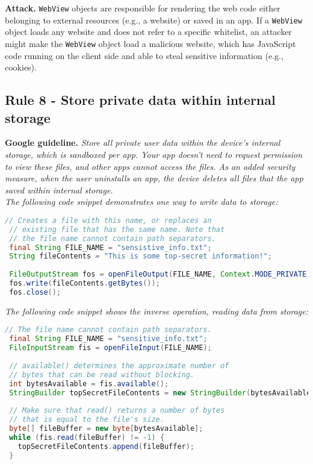 \textbf{Attack.} \texttt{WebView} objects are responsible for rendering the web code either belonging to external resources (e.g., a website) or saved in an app. If a \texttt{WebView} object loads any website and does not refer to a specific whitelist, an attacker might make the \texttt{WebView} object load a malicious website, which has JavaScript code running on the client side and able to steal sensitive information (e.g., cookies). 

\subsection{Rule 8 - Store private data within internal storage} 
\textbf{Google guideline.} \emph{ Store all private user data within the device's internal storage, which is sandboxed per app. Your app doesn't need to request permission to view these files, and other apps cannot access the files. As an added security measure, when the user uninstalls an app, the device deletes all files that the app saved within internal storage.
\\
The following code snippet demonstrates one way to write data to storage:}
\begin{lstlisting}[language=Java, caption=Write data to the internal storage, numbers=none]
 // Creates a file with this name, or replaces an
 // existing file that has the same name. Note that
 // the file name cannot contain path separators.
 final String FILE_NAME = "sensistive_info.txt";
 String fileContents = "This is some top-secret information!";
 
 FileOutputStream fos = openFileOutput(FILE_NAME, Context.MODE_PRIVATE);
 fos.write(fileContents.getBytes());
 fos.close();

\end{lstlisting}

\emph{The following code snippet shows the inverse operation, reading data from storage:}
\begin{lstlisting}[language=Java, caption=Read data from the internal storage, numbers=none]
 // The file name cannot contain path separators.
 final String FILE_NAME = "sensitive_info.txt";
 FileInputStream fis = openFileInput(FILE_NAME);
 
 // available() determines the approximate number of
 // bytes that can be read without blocking.
 int bytesAvailable = fis.available();
 StringBuilder topSecretFileContents = new StringBuilder(bytesAvailable);
 
 // Make sure that read() returns a number of bytes
 // that is equal to the file's size.
 byte[] fileBuffer = new byte[bytesAvailable];
 while (fis.read(fileBuffer) != -1) {
   topSecretFileContents.append(fileBuffer);
 }
\end{lstlisting}

